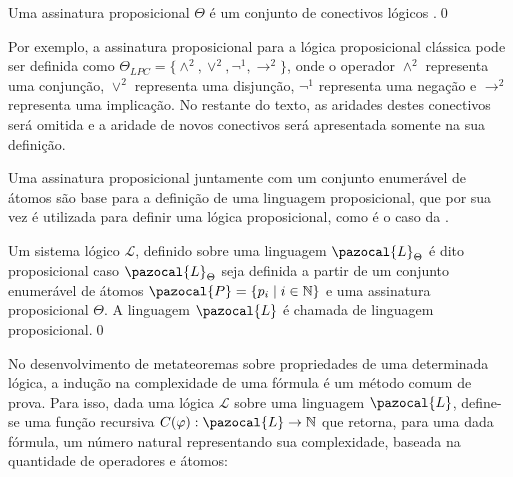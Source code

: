     \begin{definicao}
        \label{def:ass_prop}
        Uma assinatura proposicional $\Theta$ é um conjunto de conectivos lógicos .\qed{}
    \end{definicao}
    Por exemplo, a assinatura proposicional para a lógica proposicional clássica pode ser definida como $\Theta_{LPC} = \{\land^{2}, \lor^{2}, \neg^{1}, \rightarrow^{2}\}$, onde o operador $\land^{2}$ representa uma conjunção, $\lor^{2}$ representa uma disjunção, $\neg^{1}$ representa uma negação e $\rightarrow^{2}$ representa uma implicação. No restante do texto, as aridades destes conectivos será omitida e a aridade de novos conectivos será apresentada somente na sua definição.

    Uma assinatura proposicional juntamente com um conjunto enumerável de átomos são base para a definição de uma linguagem proposicional, que por sua vez é utilizada para definir uma lógica proposicional, como é o caso da \lfium{}.

    \begin{definicao}
        \label{def:proposicional}
        Um sistema lógico $\mathcal{L}$, definido sobre uma linguagem $\pazocal{L}_{\Theta}$ é dito proposicional caso $\pazocal{L}_{\Theta}$ seja definida a partir de um conjunto enumerável de átomos $\pazocal{P} = \{p_{i} \;| \; i \in \mathbb{N} \}$ e uma assinatura proposicional $\Theta$. A linguagem $\pazocal{L}$ é chamada de linguagem proposicional.\qed{}
    \end{definicao}


    No desenvolvimento de metateoremas sobre propriedades de uma determinada lógica, a indução na complexidade de uma fórmula é um método comum de prova. Para isso, dada uma lógica $\mathcal{L}$ sobre uma linguagem $\pazocal{L}$, define-se uma função recursiva $C(\phi) : \pazocal{L} \rightarrow \mathbb{N}$ que retorna, para uma dada fórmula, um número natural representando sua complexidade, baseada na quantidade de operadores e átomos:

